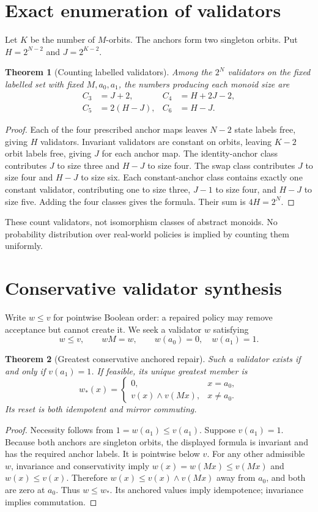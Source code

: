 \documentclass[11pt,a4paper]{article}
\newtheorem{theorem}{Theorem}[section]
\begin{document}
\section{Exact enumeration of validators}
Let $K$ be the number of $M$-orbits. The anchors form two singleton orbits. Put $H=2^{N-2}$ and $J=2^{K-2}$.
\begin{theorem}[Counting labelled validators]\label{thm:counts}
Among the $2^N$ validators on the fixed labelled set with fixed $M,a_0,a_1$, the numbers producing each monoid size are
\begin{align*}
 C_3&=J+2,& C_4&=H+2J-2,\\
 C_5&=2(H-J),& C_6&=H-J.
\end{align*}
\end{theorem}
\begin{proof}
Each of the four prescribed anchor maps leaves $N-2$ state labels free, giving $H$ validators. Invariant validators are constant on orbits, leaving $K-2$ orbit labels free, giving $J$ for each anchor map. The identity-anchor class contributes $J$ to size three and $H-J$ to size four. The swap class contributes $J$ to size four and $H-J$ to size six. Each constant-anchor class contains exactly one constant validator, contributing one to size three, $J-1$ to size four, and $H-J$ to size five. Adding the four classes gives the formula. Their sum is $4H=2^N$.
\end{proof}
These count validators, not isomorphism classes of abstract monoids. No probability distribution over real-world policies is implied by counting them uniformly.

\section{Conservative validator synthesis}
Write $w\leq v$ for pointwise Boolean order: a repaired policy may remove acceptance but cannot create it. We seek a validator $w$ satisfying
\[
 w\leq v,\qquad wM=w,\qquad w(a_0)=0,\quad w(a_1)=1.
\]
\begin{theorem}[Greatest conservative anchored repair]\label{thm:repair}
Such a validator exists if and only if $v(a_1)=1$. If feasible, its unique greatest member is
\[
 w_*(x)=\begin{cases}
 0,&x=a_0,\\
 v(x)\wedge v(Mx),&x\ne a_0.
 \end{cases}
\]
Its reset is both idempotent and mirror commuting.
\end{theorem}
\begin{proof}
Necessity follows from $1=w(a_1)\leq v(a_1)$. Suppose $v(a_1)=1$. Because both anchors are singleton orbits, the displayed formula is invariant and has the required anchor labels. It is pointwise below $v$. For any other admissible $w$, invariance and conservativity imply $w(x)=w(Mx)\leq v(Mx)$ and $w(x)\leq v(x)$. Therefore $w(x)\leq v(x)\wedge v(Mx)$ away from $a_0$, and both are zero at $a_0$. Thus $w\leq w_*$. Its anchored values imply idempotence; invariance implies commutation.
\end{proof}
\end{document}
